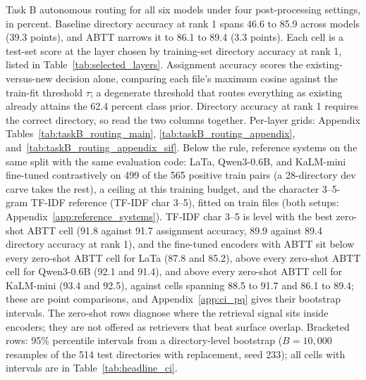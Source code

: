 \begin{table}[t]
\caption{Task B autonomous routing for all six models under four post-processing settings, in percent. Baseline directory accuracy at rank 1 spans 46.6 to 85.9 across models (39.3 points), and ABTT narrows it to 86.1 to 89.4 (3.3 points). Each cell is a test-set score at the layer chosen by training-set directory accuracy at rank 1, listed in Table~\ref{tab:selected_layers}. Assignment accuracy scores the existing-versus-new decision alone, comparing each file's maximum cosine against the train-fit threshold $\tau$; a degenerate threshold that routes everything as existing already attains the 62.4 percent class prior. Directory accuracy at rank 1 requires the correct directory, so read the two columns together. Per-layer grids: Appendix Tables~\ref{tab:taskB_routing_main}, \ref{tab:taskB_routing_appendix}, and~\ref{tab:taskB_routing_appendix_sif}. Below the rule, reference systems on the same split with the same evaluation code: LaTa, Qwen3-0.6B, and KaLM-mini fine-tuned contrastively on 499 of the 565 positive train pairs (a 28-directory dev carve takes the rest), a ceiling at this training budget, and the character 3--5-gram TF-IDF reference (TF-IDF char 3--5), fitted on train files (both setups: Appendix~\ref{app:reference_systems}). TF-IDF char 3--5 is level with the best zero-shot ABTT cell (91.8 against 91.7 assignment accuracy, 89.9 against 89.4 directory accuracy at rank 1), and the fine-tuned encoders with ABTT sit below every zero-shot ABTT cell for LaTa (87.8 and 85.2), above every zero-shot ABTT cell for Qwen3-0.6B (92.1 and 91.4), and above every zero-shot ABTT cell for KaLM-mini (93.4 and 92.5), against cells spanning 88.5 to 91.7 and 86.1 to 89.4; these are point comparisons, and Appendix~\ref{app:ci_pq} gives their bootstrap intervals. The zero-shot rows diagnose where the retrieval signal sits inside encoders; they are not offered as retrievers that beat surface overlap. Bracketed rows: 95\% percentile intervals from a directory-level bootstrap ($B=10{,}000$ resamples of the 514 test directories with replacement, seed 233); all cells with intervals are in Table~\ref{tab:headline_ci}.}
\label{tab:taskB_headline}
\end{table}
